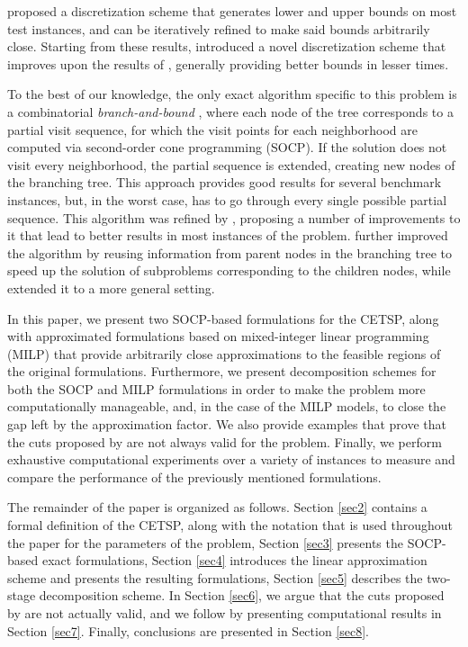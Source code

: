 \documentclass[pdflatex,sn-mathphys-num]{sn-jnl}%
\begin{document}
\citet{behdani} proposed a discretization scheme that generates lower and upper bounds on most test instances, and can be iteratively refined to make said bounds arbitrarily close. Starting from these results, \citet{carrabs} introduced a novel discretization scheme that improves upon the results of \cite{behdani}, generally providing better bounds in lesser times.

To the best of our knowledge, the only exact algorithm specific to this problem is a combinatorial \textit{branch-and-bound} \cite{branch}, where each node of the tree corresponds to a partial visit sequence, for which the visit points for each neighborhood are computed via second-order cone programming (SOCP). If the solution does not visit every neighborhood, the partial sequence is extended, creating new nodes of the branching tree. This approach provides good results for several benchmark instances, but, in the worst case, has to go through every single possible partial sequence. This algorithm was refined by \citet{bnb-upgrade}, proposing a number of improvements to it that lead to better results in most instances of the problem. \citet{bnb-efficient} further improved the algorithm by reusing information from parent nodes in the branching tree to speed up the solution of subproblems corresponding to the children nodes, while \citet{DECKEROVA2024125185} extended it to a more general setting.
 
In this paper, we present two SOCP-based formulations for the CETSP, along with approximated formulations based on mixed-integer linear programming (MILP) that provide arbitrarily close approximations to the feasible regions of the original formulations. Furthermore, we present decomposition schemes for both the SOCP and MILP formulations in order to make the problem more computationally manageable, and, in the case of the MILP models, to close the gap left by the approximation factor. We also provide examples that prove that the cuts proposed by \cite{walteros} are not always valid for the problem. Finally, we perform exhaustive computational experiments over a variety of instances to measure and compare the performance of the previously mentioned formulations.

The remainder of the paper is organized as follows. Section \ref{sec2} contains a formal definition of the CETSP, along with the notation that is used throughout the paper for the parameters of the problem, Section \ref{sec3} presents the SOCP-based exact formulations, Section \ref{sec4} introduces the linear approximation scheme and presents the resulting formulations, Section \ref{sec5} describes the two-stage decomposition scheme. In Section \ref{sec6}, we argue that the cuts proposed by \cite{walteros} are not actually valid, and we follow by presenting computational results in Section \ref{sec7}. Finally, conclusions are presented in Section \ref{sec8}.
\end{document}
